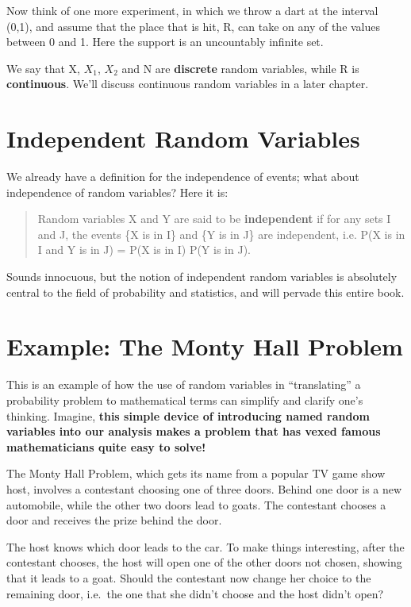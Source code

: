 Now think of one more experiment, in which we throw a dart at the
interval (0,1), and assume that the place that is hit, R, can take on
any of the values between 0 and 1.  Here the support is an uncountably
infinite set.

We say that X, $X_1$, $X_2$ and N are {\bf discrete} random variables,
while R is {\bf continuous}.  We'll discuss continuous random variables
in a later chapter.

\section{Independent Random Variables}
\label{indepdef}

We already have a definition for the independence of events; what about
independence of random variables?  Here it is:

\begin{quote}

Random variables X and Y are said to be {\bf independent} if for any
sets I and J, the events \{X is in I\} and \{Y is in J\} are
independent, i.e.  P(X is in I and Y is in J) = P(X is in I) P(Y is in
J). 

\end{quote}

Sounds innocuous, but the notion of independent random variables is
absolutely central to the field of probability and statistics, and will
pervade this entire book.  

\section{Example:  The Monty Hall Problem}

This is an example of how the use of random variables in ``translating''
a probability problem to mathematical terms can simplify and clarify
one's thinking.  Imagine, {\bf this simple device of introducing named
random variables into our analysis makes a problem that has vexed famous
mathematicians quite easy to solve!}

The Monty Hall Problem, which gets its name from a popular TV game show
host, involves a contestant choosing one of three doors.  Behind one
door is a new automobile, while the other two doors lead to goats.  The
contestant chooses a door and receives the prize behind the door.

The host knows which door leads to the car.  To make things interesting,
after the contestant chooses, the host will open one of the other doors
not chosen, showing that it leads to a goat.  Should the contestant now
change her choice to the remaining door, i.e.\ the one that she didn't
choose and the host didn't open?

